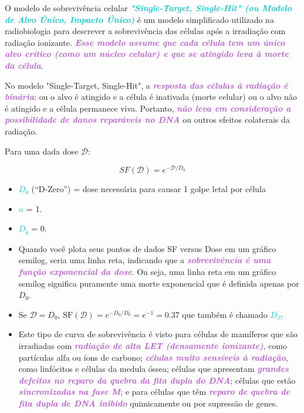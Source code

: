 \documentclass[11pt,a4paper]{article}
\newcounter{exemplo}
\begin{document}
	O modelo de sobrevivência celular\textcolor{DarkTurquoise}{\textbf{\textit{ "Single-Target, Single-Hit" (ou Modelo de Alvo Único, Impacto Único)}}} é um modelo simplificado utilizado na radiobiologia para descrever a sobrevivência das células após a irradiação com radiação ionizante. \textcolor{MediumOrchid}{\textbf{\textit{Esse modelo assume que cada célula tem um único alvo crítico (como um núcleo celular) e que se atingido leva à morte da célula}}}.

	No modelo "Single-Target, Single-Hit", a \textcolor{MediumOrchid}{\textbf{\textit{resposta das células à radiação é binária}}}: ou o alvo é atingido e a célula é inativada (morte celular) ou o alvo não é atingido e a célula permanece viva. Portanto, \textcolor{MediumOrchid}{\textbf{\textit{não leva em consideração a possibilidade de danos reparáveis no DNA}}} ou outros efeitos colaterais da radiação.

	Para uma dada dose $\mathcal{D}$: 

	\begin{equation}
		SF(\mathcal{D}) = e^{-\mathcal{D}/D_0}
	\end{equation}

	\begin{exemplo}[onde:]
		\begin{itemize}
			\item \textcolor{DarkTurquoise}{\textbf{$D_0$}} (“D-Zero”) = dose necessária para causar 1 golpe letal por célula
			\item \textcolor{DarkTurquoise}{\textbf{$n$}} = 1.
			\item \textcolor{DarkTurquoise}{\textbf{$D_q$}} = 0.
			\item Quando você plota seus pontos de dados SF versus Dose em um gráfico semilog, seria uma linha reta, indicando que a \textcolor{MediumOrchid}{\textbf{\textit{sobrevivência é uma função exponencial da dose}}}. Ou seja, uma linha reta em um gráfico semilog significa puramente uma morte exponencial que é definida apenas por $D_0$. 
			\item Se $\mathcal{D} = D_0$, $\text{SF}(\mathcal{D}) = e^{- D_0/D_0} = e^{-1} = 0.37$ que também é chamado \textcolor{DarkTurquoise}{\textbf{$D_{37}$}}
			\item Este tipo de curva de sobrevivência é visto para células de mamíferos que são irradiadas com \textcolor{MediumOrchid}{\textbf{\textit{radiação de alta LET (densamente ionizante)}}}, como partículas alfa ou íons de carbono; \textcolor{MediumOrchid}{\textbf{\textit{células muito sensíveis à radiação}}}, como linfócitos e células da medula óssea; células que apresentam \textcolor{MediumOrchid}{\textbf{\textit{grandes defeitos no reparo da quebra da fita dupla do DNA}}}; células que estão \textcolor{MediumOrchid}{\textbf{\textit{sincronizadas na fase M}}}; e para células que têm \textcolor{MediumOrchid}{\textbf{\textit{reparo de quebra de fita dupla de DNA inibido}}} quimicamente ou por supressão de genes.
		\end{itemize}
	\end{exemplo}
\end{document}
